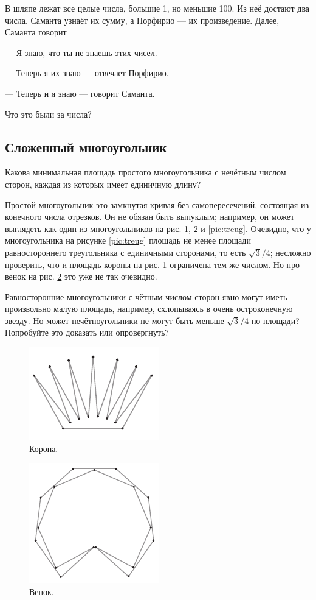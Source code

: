 В шляпе лежат все целые числа, большие 1, но меньшие 100.
Из неё достают два числа.
Саманта узнаёт их сумму, а Порфирио --- их произведение.
Далее, Саманта говорит

--- Я знаю, что ты не знаешь этих чисел.

--- Теперь я их знаю --- отвечает Порфирио.

--- Теперь и я знаю --- говорит Саманта.

Что это были за числа?

\subsection*{Сложенный многоугольник}\label{Сложенный многоугольник}

Какова минимальная площадь простого многоугольника с нечётным числом сторон, каждая из которых имеет единичную длину?

Простой многоугольник это замкнутая кривая без самопересечений, состоящая из конечного числа отрезков.
Он не обязан быть выпуклым; например, он может выглядеть как один из многоугольников на рис. \ref{pic:korona},
\ref{pic:wreath} и \ref{pic:treug}.
Очевидно, что у многоугольника на рисунке \ref{pic:treug} площадь не менее площади равностороннего треугольника с единичными сторонами, то есть $\sqrt{3}/4$;
несложно проверить, что и площадь короны на рис. \ref{pic:korona} ограничена тем же числом.
Но про венок на рис. \ref{pic:wreath} это уже не так очевидно.

Равносторонние многоугольники с чётным числом сторон явно могут иметь произвольно малую площадь, например, схлопываясь в очень остроконечную звезду.
Но может нечётноугольники не могут быть меньше $\sqrt{3}/4$ по площади?
Попробуйте это доказать или опровергнуть?

\begin{figure}[htb!]
\centering
\includegraphics[scale=.95]{pics/korona}
\caption{Корона.}
\label{pic:korona}
\end{figure}

\begin{figure}[htb!]
\centering
\includegraphics[scale=.95]{pics/wreath}
\caption{Венок.}
\label{pic:wreath}
\end{figure}

